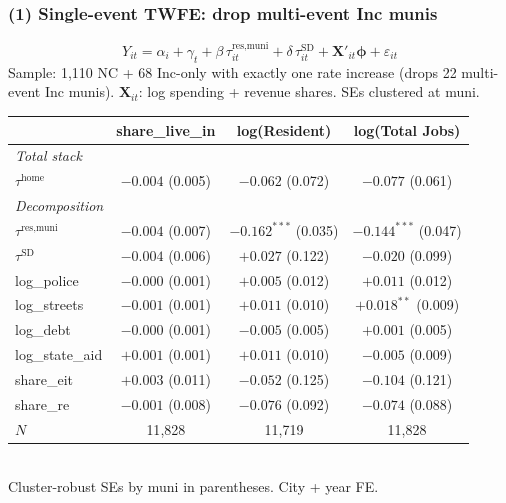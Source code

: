 \documentclass[xcolor = x11names, compress, aspectratio = 169]{beamer}
\renewcommand{\(}{\begin{columns}}
\renewcommand{\)}{\end{columns}}
\newcommand{\<}[1]{\begin{column}{#1}}
\renewcommand{\>}{\end{column}}
\begin{document}
\begin{frame}
\frametitle{(1) Single-event TWFE: drop multi-event Inc munis}
    \scriptsize
    \[
        Y_{it} = \alpha_i + \gamma_t
        + \beta\,\tau^{\text{res,muni}}_{it} + \delta\,\tau^{\text{SD}}_{it}
        + \mathbf{X}'_{it}\boldsymbol{\phi} + \varepsilon_{it}
    \]
    Sample: 1{,}110 NC + 68 Inc-only with exactly one rate increase
    (drops 22 multi-event Inc munis). $\mathbf{X}_{it}$: log spending +
    revenue shares. SEs clustered at muni.
    \centering
    \renewcommand{\arraystretch}{1.05}
    \setlength{\tabcolsep}{6pt}
    \begin{tabular}{lccc}
        \toprule
        & share\_live\_in & log(Resident) & log(Total Jobs) \\
        \midrule
        \multicolumn{4}{l}{\textit{Total stack}} \\
        $\tau^{\text{home}}$    & $-0.004$ (0.005)  & $-0.062$ (0.072) & $-0.077$ (0.061) \\
        \multicolumn{4}{l}{\textit{Decomposition}} \\
        $\tau^{\text{res,muni}}$ & $-0.004$ (0.007)   & $-0.162^{***}$ (0.035) & $-0.144^{***}$ (0.047) \\
        $\tau^{\text{SD}}$       & $-0.004$ (0.006)   & $+0.027$ (0.122)        & $-0.020$ (0.099) \\
        \midrule
        log\_police       & $-0.000$ (0.001) & $+0.005$ (0.012) & $+0.011$ (0.012) \\
        log\_streets      & $-0.001$ (0.001) & $+0.011$ (0.010) & $+0.018^{**}$ (0.009) \\
        log\_debt         & $-0.000$ (0.001) & $-0.005$ (0.005) & $+0.001$ (0.005) \\
        log\_state\_aid   & $+0.001$ (0.001) & $+0.011$ (0.010) & $-0.005$ (0.009) \\
        share\_eit        & $+0.003$ (0.011) & $-0.052$ (0.125) & $-0.104$ (0.121) \\
        share\_re         & $-0.001$ (0.008) & $-0.076$ (0.092) & $-0.074$ (0.088) \\
        \midrule
        $N$               & 11{,}828 & 11{,}719 & 11{,}828 \\
        \bottomrule
    \end{tabular}
    \vspace{0.05cm}\\
    \scriptsize Cluster-robust SEs by muni in parentheses. City + year FE.
\end{frame}
\end{document}
